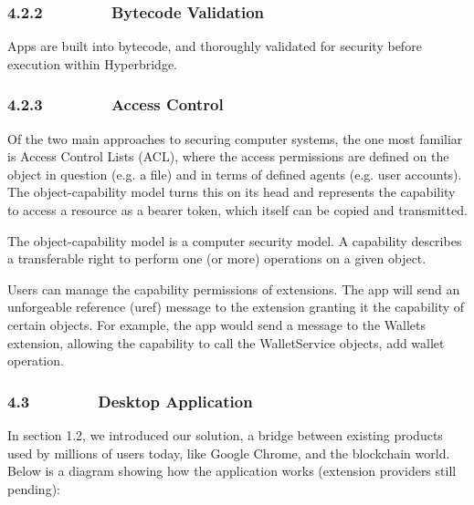 \documentclass[]{article}
\begin{document}
\hypertarget{h.tjw69hzdzn50}{%
\subsubsection{\texorpdfstring{{4.2.2~~~~~~~~Bytecode
Validation}}{4.2.2~~~~~~~~Bytecode Validation}}\label{h.tjw69hzdzn50}}

{Apps are built into bytecode, and thoroughly validated for security
before execution within Hyperbridge. }

\hypertarget{h.10usjkssy6lf}{%
\subsubsection{\texorpdfstring{{4.2.3~~~~~~~~Access
Control}}{4.2.3~~~~~~~~Access Control}}\label{h.10usjkssy6lf}}

{Of the two main approaches to securing computer systems, the one most
familiar is Access Control Lists (ACL), where the access permissions are
defined on the object in question (e.g. a file) and in terms of defined
agents (e.g. user accounts). The object-capability model turns this on
its head and represents the capability to access a resource as a bearer
token, which itself can be copied and transmitted.}

{}

{The object-capability model is a computer security model. A capability
describes a transferable right to perform one (or more) operations on a
given object.}

{}

{Users can manage the capability permissions of extensions. The app will
send an unforgeable reference (uref) message to the extension granting
it the capability of certain objects. For example, the app would send a
message to the Wallets extension, allowing the capability to call the
WalletService objects, add wallet operation.}

{}

\hypertarget{h.sbit2az1gf9l}{%
\subsubsection{\texorpdfstring{{4.3~~~~~~~~Desktop
Application}}{4.3~~~~~~~~Desktop Application}}\label{h.sbit2az1gf9l}}

{In section 1.2, we introduced our solution, a bridge between existing
products used by millions of users today, like Google Chrome, and the
blockchain world. Below is a diagram showing how the application works
(extension providers still pending):\\
}
\end{document}

